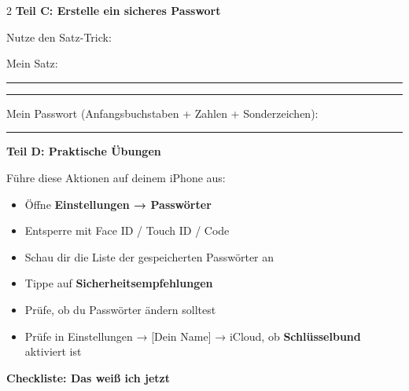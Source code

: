 \documentclass[a4paper,landscape,8pt]{extarticle}
\begin{document}
\begin{multicols}{2}
\textbf{\large Teil C: Erstelle ein sicheres Passwort}

Nutze den Satz-Trick:

\vspace{2mm}

Mein Satz: \rule{6cm}{0.4pt}

\rule{7cm}{0.4pt}

\vspace{2mm}

Mein Passwort (Anfangsbuchstaben + Zahlen + Sonderzeichen):

\rule{7cm}{0.4pt}

\columnbreak

\textbf{\large Teil D: Praktische Übungen}

Führe diese Aktionen auf deinem iPhone aus:

\vspace{2mm}

\begin{itemize}[label=$\square$, itemsep=3pt]
\item Öffne \textbf{Einstellungen → Passwörter}
\item Entsperre mit Face ID / Touch ID / Code
\item Schau dir die Liste der gespeicherten Passwörter an
\item Tippe auf \textbf{Sicherheitsempfehlungen}
\item Prüfe, ob du Passwörter ändern solltest
\item Prüfe in Einstellungen → [Dein Name] → iCloud, ob \textbf{Schlüsselbund} aktiviert ist
\end{itemize}

\vspace{4mm}

\textbf{\large Checkliste: Das weiß ich jetzt}

\vspace{2mm}

\begin{center}
\end{center}


\end{multicols}
\end{document}
